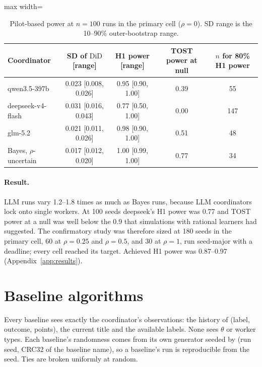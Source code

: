 \documentclass[11pt,letterpaper]{article}
\newcommand{\did}{\mathrm{DiD}}
\numberwithin{equation}{section}
\numberwithin{table}{section}
\numberwithin{figure}{section}
\numberwithin{algorithm}{section}
\begin{document}
\begin{table}[h]
\centering\small
\caption{Pilot-based power at $n=100$ runs in the primary cell ($\rho=0$). SD range is the 10--90\% outer-bootstrap range.}
\label{tab:power}
\begin{adjustbox}{max width=\linewidth}
\begin{tabular}{lcccc}
\toprule
Coordinator & SD of $\did$ [range] & H1 power [range] & TOST power at null & $n$ for 80\% H1 power \\
\midrule
qwen3.5-397b & 0.023 [0.008, 0.026] & 0.95 [0.90, 1.00] & 0.39 & 55 \\
deepseek-v4-flash & 0.031 [0.016, 0.043] & 0.77 [0.50, 1.00] & 0.00 & 147 \\
glm-5.2 & 0.021 [0.011, 0.026] & 0.98 [0.90, 1.00] & 0.51 & 48 \\
Bayes, $\rho$-uncertain & 0.017 [0.012, 0.020] & 1.00 [0.99, 1.00] & 0.77 & 34 \\
\bottomrule
\end{tabular}
\end{adjustbox}
\end{table}

\paragraph{Result.} LLM runs vary 1.2--1.8 times as much as Bayes runs, because LLM coordinators lock onto single workers. At 100 seeds deepseek's H1 power was 0.77 and TOST power at a null was well below the 0.9 that simulations with rational learners had suggested. The confirmatory study was therefore sized at 180 seeds in the primary cell, 60 at $\rho=0.25$ and $\rho=0.5$, and 30 at $\rho=1$, run seed-major with a deadline; every cell reached its target. Achieved H1 power was 0.87--0.97 (Appendix~\ref{app:results}).

\section{Baseline algorithms}\label{app:baselines}

Every baseline sees exactly the coordinator's observations: the history of (label, outcome, points), the current title and the available labels. None sees $\theta$ or worker types. Each baseline's randomness comes from its own generator seeded by (run seed, CRC32 of the baseline name), so a baseline's run is reproducible from the seed. Ties are broken uniformly at random.
\end{document}
